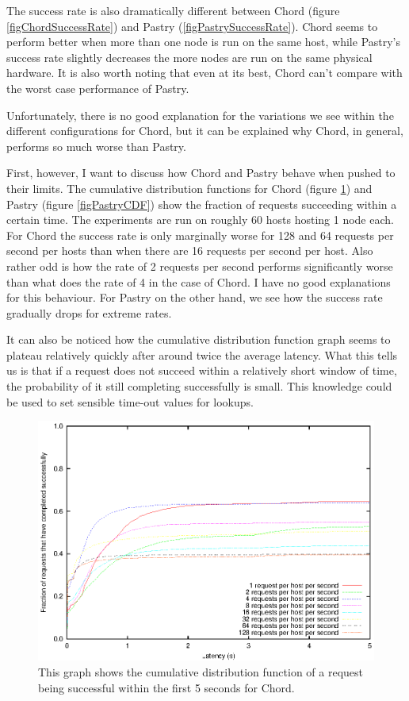 The success rate is also dramatically different between Chord (figure \ref{figChordSuccessRate}) and Pastry (\ref{figPastrySuccessRate}). Chord seems to perform better when more than one node is run on the same host, while Pastry's success rate slightly decreases the more nodes are run on the same physical hardware. It is also worth noting that even at its best, Chord can't compare with the worst case performance of Pastry.

Unfortunately, there is no good explanation for the variations we see within the different configurations for Chord, but it can be explained why Chord, in general, performs so much worse than Pastry.

First, however, I want to discuss how Chord and Pastry behave when pushed to their limits. The cumulative distribution functions for Chord (figure \ref{figChordCDF}) and Pastry (figure \ref{figPastryCDF}) show the fraction of requests succeeding within a certain time. The experiments are run on roughly 60 hosts hosting 1 node each. 
For Chord the success rate is only marginally worse for 128 and 64 requests per second per hosts than when there are 16 requests per second per host. Also rather odd is how the rate of 2 requests per second performs significantly worse than what does the rate of 4 in the case of Chord. I have no good explanations for this behaviour.
For Pastry on the other hand, we see how the success rate gradually drops for extreme rates.

It can also be noticed how the cumulative distribution function graph seems to plateau relatively quickly after around twice the average latency. What this tells us is that if a request does not succeed within a relatively short window of time, the probability of it still completing successfully is small. This knowledge could be used to set sensible time-out values for lookups.

\begin{figure}[!htbp]
  \begin{center}
    \includegraphics[width=0.9\linewidth]{illustrations/cdf_chord.eps}
    \caption{This graph shows the cumulative distribution function of a request being successful within the first 5 seconds for Chord.}
    \label{figChordCDF}
  \end{center}
\end{figure}

